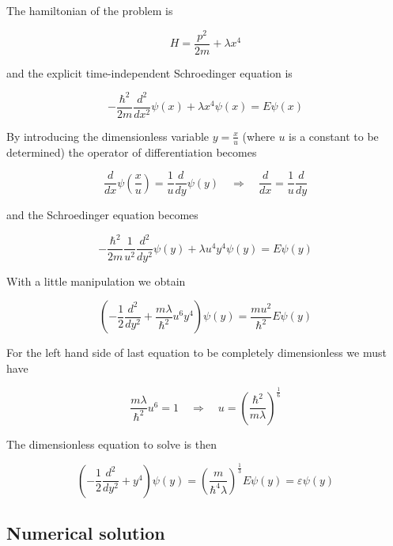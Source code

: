 \documentclass{article}
\begin{document}
The hamiltonian of the problem is

\begin{equation}
H = \frac{p^2}{2m} + \lambda x^4
\end{equation}

and the explicit time-independent Schroedinger equation is

\begin{equation}
-\frac{\hbar^2}{2m} \frac{d^2}{dx^2} \psi(x) + \lambda x^4 \psi(x) = E \psi(x)
\end{equation}

By introducing the dimensionless variable \( y = \frac{x}{u} \) (where \( u \) is a constant to be determined) the operator of differentiation becomes

\begin{equation}
\frac{d}{dx} \psi \left( \frac{x}{u} \right) = \frac{1}{u} \frac{d}{dy} \psi(y) \quad \Rightarrow \quad \frac{d}{dx} = \frac{1}{u} \frac{d}{dy}
\end{equation}

and the Schroedinger equation becomes

\begin{equation}
-\frac{\hbar^2}{2m} \frac{1}{u^2} \frac{d^2}{dy^2} \psi(y) + \lambda u^4 y^4 \psi(y) = E \psi(y)
\end{equation}

With a little manipulation we obtain

\begin{equation}
\left( -\frac{1}{2}\frac{d^2}{dy^2} + \frac{m\lambda}{\hbar^2} u^6 y^4 \right) \psi(y) = \frac{mu^2}{\hbar^2} E \psi(y)
\end{equation}

For the left hand side of last equation to be completely dimensionless we must have

\begin{equation}
\frac{m\lambda}{\hbar^2} u^6 = 1 \quad \Rightarrow \quad u = \left( \frac{\hbar^2}{m\lambda} \right)^{\frac{1}{6}}
\end{equation}

The dimensionless equation to solve is then

\begin{equation}
\left( -\frac{1}{2}\frac{d^2}{dy^2} + y^4 \right) \psi(y) = \left(\frac{m}{\hbar^4 \lambda} \right)^{\frac{1}{3}} E \psi(y) = \varepsilon \psi(y)
\end{equation}

\subsection{Numerical solution}
\end{document}
